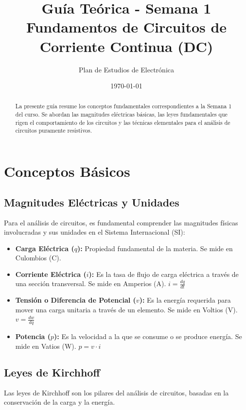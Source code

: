 \documentclass[12pt, a4paper]{article}
\begin{document}
\title{\textbf{Guía Teórica - Semana 1} \\ \large Fundamentos de Circuitos de Corriente Continua (DC)}
\author{Plan de Estudios de Electrónica}
\date{\today}
\maketitle

\begin{abstract}
La presente guía resume los conceptos fundamentales correspondientes a la Semana 1 del curso. Se abordan las magnitudes eléctricas básicas, las leyes fundamentales que rigen el comportamiento de los circuitos y las técnicas elementales para el análisis de circuitos puramente resistivos.
\end{abstract}

\tableofcontents
\newpage

\section{Conceptos Básicos}

\subsection{Magnitudes Eléctricas y Unidades}
Para el análisis de circuitos, es fundamental comprender las magnitudes físicas involucradas y sus unidades en el Sistema Internacional (SI):
\begin{itemize}
    \item \textbf{Carga Eléctrica ($q$):} Propiedad fundamental de la materia. Se mide en Culombios (C).
    \item \textbf{Corriente Eléctrica ($i$):} Es la tasa de flujo de carga eléctrica a través de una sección transversal. Se mide en Amperios (A). $i = \frac{dq}{dt}$
    \item \textbf{Tensión o Diferencia de Potencial ($v$):} Es la energía requerida para mover una carga unitaria a través de un elemento. Se mide en Voltios (V). $v = \frac{dw}{dq}$
    \item \textbf{Potencia ($p$):} Es la velocidad a la que se consume o se produce energía. Se mide en Vatios (W). $p = v \cdot i$
\end{itemize}

\subsection{Leyes de Kirchhoff}
Las leyes de Kirchhoff son los pilares del análisis de circuitos, basadas en la conservación de la carga y la energía.
\end{document}
